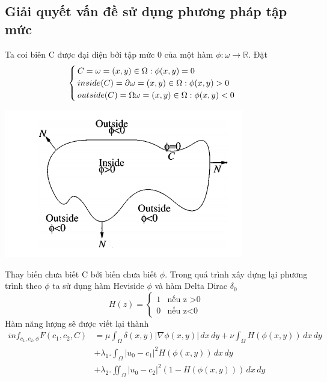 \documentclass[12pt,oneside,a4]{report}
\begin{document}
\subsection{Giải quyết vấn đề sử dụng phương pháp tập mức}
Ta coi biên C được đại diện bởi tập mức 0 của một hàm $\phi: \omega \rightarrow \mathbb{R}$. Đặt 
\begin{equation}
\begin{cases}
 C= \omega ={(x,y)\in \Omega: \phi(x,y)=0}\\
 inside(C)=\partial \omega ={(x,y)\in \Omega: \phi(x,y)>0}\\
 outside(C)=\Omega \/ \omega ={(x,y)\in \Omega: \phi(x,y)<0}
   \end{cases}
\end{equation}
 \begin{center}
\includegraphics[scale=0.6]{figure/insideoutside.png}
\end{center}
Thay biến chưa biết C bởi biến chưa biết $\phi$.  Trong quá trình xây dựng lại phương trình theo $\phi$ ta sử dụng hàm Heviside $\phi$ và hàm Delta Dirac $\delta_0$
 \begin{equation}
 H(z)=
\begin{cases}
 1 & \text{nếu z >0}\\
0 & \text{nếu z<0}
   \end{cases}
\end{equation}
Hàm năng lượng sẽ được viết lại thành
\begin{equation}
\begin{split}
inf_{c_1,c_2,\phi} F(c_1, c_2, C)&=\mu \int_{\Omega}\delta(x,y)|\nabla \phi(x,y)|\,dx\,dy+\nu  \int_{\Omega}H( \phi(x,y))\,dx\,dy \\ 
&+\lambda_1 .\int_{\Omega} |u_0-c_1|^2H(\phi(x,y)) \,dx\,dy\\&+\lambda_2 .\iint_{\Omega} |u_0-c_2|^2(1-H(\phi(x,y))) \,dx\,dy
\end{split}
\end{equation}
\end{document}
